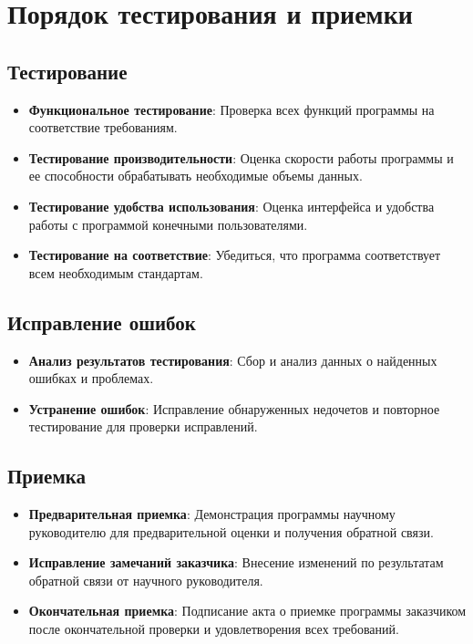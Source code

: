 \documentclass{article}
\begin{document}
    \section {Порядок тестирования и приемки}

    \subsection{Тестирование}
    \begin{itemize}
        \item \textbf{Функциональное тестирование}: Проверка всех функций программы на соответствие требованиям.
        \item \textbf{Тестирование производительности}: Оценка скорости работы программы и ее способности обрабатывать необходимые объемы данных.
        \item \textbf{Тестирование удобства использования}: Оценка интерфейса и удобства работы с программой конечными пользователями.
        \item \textbf{Тестирование на соответствие}: Убедиться, что программа соответствует всем необходимым стандартам.
    \end{itemize}

    \subsection{Исправление ошибок}
    \begin{itemize}
        \item \textbf{Анализ результатов тестирования}: Сбор и анализ данных о найденных ошибках и проблемах.
        \item \textbf{Устранение ошибок}: Исправление обнаруженных недочетов и повторное тестирование для проверки исправлений.
    \end{itemize}

    \subsection{Приемка}
    \begin{itemize}
        \item \textbf{Предварительная приемка}: Демонстрация программы научному руководителю для предварительной оценки и получения обратной связи.
        \item \textbf{Исправление замечаний заказчика}: Внесение изменений по результатам обратной связи от научного руководителя.
        \item \textbf{Окончательная приемка}: Подписание акта о приемке программы заказчиком после окончательной проверки и удовлетворения всех требований.
    \end{itemize}
\end{document}
